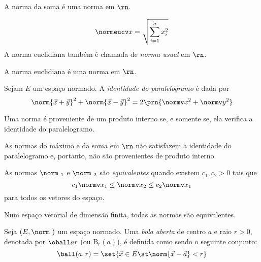 \begin{fact}
	A norma da soma é uma norma em $\rn$.
\end{fact}

\begin{definition}
	\[\normeucv x = \sqrt{\sum\limits_{i=1}^n x_i^2}\]
	A norma euclidiana também é chamada de \emph{norma usual} em $\rn$.
\end{definition}

\begin{fact}
	A norma euclidiana é uma norma em $\rn$.
\end{fact}

\begin{definition}
	Sejam $E$ um espaço normado. A \emph{identidade do paralelogramo} é dada
	por 
	\[\norm{\vec x+\vec y}^2 +\norm{\vec x-\vec y}^2 = 2\prn{\normv x^2+\normv y^2} \]
\end{definition}

\begin{theorem}
	Uma norma é proveniente de um produto interno se, e somente se, ela verifica a 
	identidade do paralelogramo.
\end{theorem}

\begin{fact}
	As normas do máximo e da soma em $\rn$ não satisfazem a identidade do paralelogramo
	e, portanto, não são provenientes de produto interno.
\end{fact}

\begin{definition}
	As normas $\norm\ {}_1$ e $\norm\ {}_2$ são \emph{equivalentes} quando existem $c_1,c_2> 0$
	tais que \[c_1 \normv x_1 \le \normv x_2 \le c_2 \normv x_1\] para todos os vetores do espaço.
\end{definition}

\begin{fact}
	Num espaço vetorial de dimensão finita, todas as normas são equivalentes.
\end{fact}

\begin{definition}
	Seja $(E, \norm\ )$ um espaço normado. Uma \emph{bola aberta}  de centro $a$ e raio $ r>0$,
	denotada por $\oball ar$ (ou $\mathrm B_r(a)$), é definida como sendo o seguinte conjunto:
	\begin{displaymath}
		\ball(a,r) = \set{\vec x \in E \st \norm{\vec x - \vec a} < r}
	\end{displaymath}
\end{definition}

